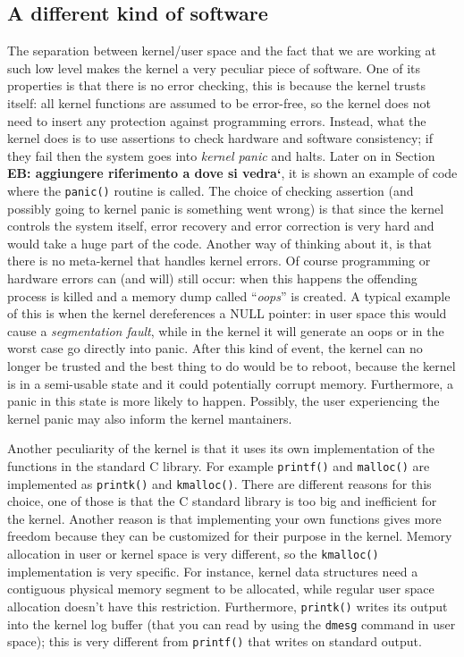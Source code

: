 \documentclass[10pt, oneside]{book}
\newcommand{\mycomment}[1]{\textbf{#1}}  %
\begin{document}
\subsection{A different kind of software}
The separation between kernel/user space and the fact that we are working at such low level makes the kernel a very peculiar piece of software. One of its properties is that there is no error checking, this is because the kernel trusts itself: all kernel functions are assumed to be error-free, so the kernel does not need to insert any protection against programming errors\cite{cesati}. Instead, what the kernel does is to use assertions to check hardware and software consistency; if they fail then the system goes into \textit{kernel panic} and halts. Later on in Section \mycomment{EB: aggiungere riferimento a dove si vedra`}, it is shown an example of code where the \verb|panic()| routine is called. The choice of checking assertion (and possibly going to kernel panic is something went wrong) is that since the kernel controls the system itself, error recovery and error correction is very hard and would take a huge part of the code. Another way of thinking about it, is that there is no meta-kernel that handles kernel errors. Of course programming or hardware errors can (and will) still occur: when this happens the offending process is killed and a memory dump called ``\textit{oops}'' is created. A typical example of this is when the kernel dereferences a NULL pointer: in user space this would cause a \textit{segmentation fault}, while in the kernel it will generate an oops or in the worst case go directly into panic. After this kind of event, the kernel can no longer be trusted and the best thing to do would be to reboot, because the kernel is in a semi-usable state and it could potentially corrupt memory. Furthermore, a panic in this state is more likely to happen. %
Possibly, the user experiencing the kernel panic may also inform the kernel mantainers.

Another peculiarity of the kernel is that it uses its own implementation of the functions in the standard C library. For example \verb|printf()| and \verb|malloc()| are implemented as \verb|printk()| and \verb|kmalloc()|. There are different reasons for this choice, one of those is that the C standard library is too big and inefficient for the kernel. Another reason is that implementing your own functions gives more freedom because they can be customized for their purpose in the kernel. Memory allocation in user or kernel space is very different, so the \verb|kmalloc()| implementation is very specific. For instance, kernel data structures need a contiguous physical memory segment to be allocated, while regular user space allocation doesn't have this restriction. Furthermore, \verb|printk()| writes its output into the kernel log buffer (that you can read by using the \verb|dmesg| command in user space); this is very different from \verb|printf()| that writes on standard output.
\end{document}
